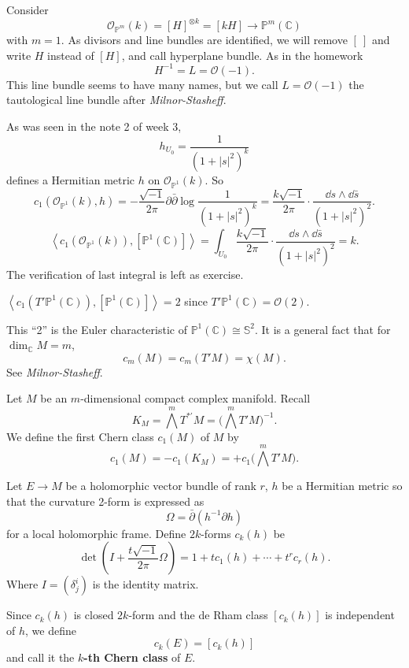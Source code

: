 \documentclass[12pt]{article}
\begin{document}
\begin{example}
  Consider \[
    \mathcal{O}_{\mathbb{P}^m}(k)=[H]^{\otimes k}=[kH]\to \mathbb{P}^m(\mathbb{C})
  \] with \(m=1\). As divisors and line bundles are identified, we will remove
  \([\ ]\) and write \(H\) instead of \([H]\), and call hyperplane bundle. As in the
  homework \[
    H^{-1}=L=\mathcal{O}(-1)
  .\] This line bundle seems to have many names, but we call \(L=\mathcal{O}(-1)\)
  the tautological line bundle after \emph{Milnor-Stasheff}.

  As was seen in the note 2 of week 3, \[
    h_{U_0}=\frac{1}{(1+|s|^2)^k}
  \] defines a Hermitian metric \(h\) on \(\mathcal{O}_{\mathbb{P}^1}(k)\). So \[
    c_1(\mathcal{O}_{\mathbb{P}^1}(k),h)=-\frac{\sqrt{-1}}{2\pi}\partial\bar{\partial}
    \log \frac{1}{(1+|s|^2)^k}
    =\frac{k\sqrt{-1}}{2\pi}\cdot \frac{\dd{s}\wedge \dd{\bar{s}}}{(1+|s|^2)^2}
  .\] \[
    \left<c_1(\mathcal{O}_{\mathbb{P}^1}(k)),[\mathbb{P}^1(\mathbb{C})]\right> 
    =\int_{U_0}\frac{k\sqrt{-1}}{2\pi}\cdot\frac{\dd{s}\wedge\dd{\bar{s}}}{(1+|s|^2)^2}
    =k
  .\]
  The verification of last integral is left as exercise.
\end{example}

\begin{corollary}
  \(\left<c_1(T'\mathbb{P}^1(\mathbb{C})),[\mathbb{P}^1(\mathbb{C})]\right> =2\)
  since \(T'\mathbb{P}^1(\mathbb{C})=\mathcal{O}(2)\).
\end{corollary}

\begin{remark}
  This ``2'' is the Euler characteristic of \(\mathbb{P}^1(\mathbb{C})\cong
  \mathbb{S}^2\). It is a general fact that for \(\dim_{\mathbb{C}}M=m\), \[
    c_m(M)=c_m(T'M)=\chi(M)
  .\] See \emph{Milnor-Stasheff}.
\end{remark}

\begin{definition}
  Let \(M\) be an \(m\)-dimensional compact complex manifold. Recall \[
    K_M=\bigwedge^m T^{*\prime}M=\Big(\bigwedge^m T'M\Big)^{-1}
  .\] We define the first Chern class \(c_1(M)\) of \(M\) by \[
    c_1(M)=-c_1(K_M)=+c_1\Big(\bigwedge^m T'M\Big)
  .\] 
\end{definition}

\begin{definition}
  Let \(E\to M\) be a holomorphic vector bundle of rank \(r\), \(h\) be a Hermitian
  metric so that the curvature 2-form is expressed as \[
    \Omega=\bar{\partial}(h^{-1}\partial h)
  \] for a local holomorphic frame. Define \(2k\)-forms \(c_k(h)\) be \[
    \det(I+\frac{t\sqrt{-1}}{2\pi}\Omega)=1+tc_1(h)+\cdots +t^r c_r(h)
  .\] Where \(I=(\delta^i_j)\) is the identity matrix.
  
  Since \(c_k(h)\) is closed \(2k\)-form and the de Rham class \([c_k(h)]\) is
  independent of \(h\), we define \[
    c_k(E)=[c_k(h)]
  \] and call it the \textbf{\(k\)-th Chern class} of \(E\).
\end{definition}
\end{document}
